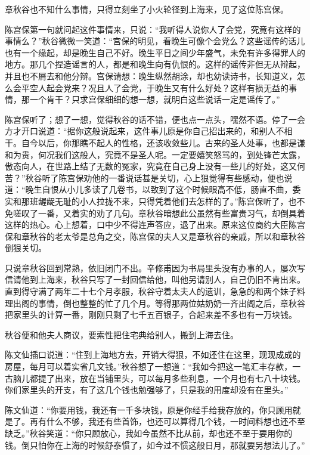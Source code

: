 \documentclass[12pt,UTF8]{ctexbook}
\begin{document}
{{{章秋谷也不知什么事情，只得立刻坐了小火轮径到上海来，见了这位陈宫保。

陈宫保第一句就问起这件事情来，只说：“我听得人说你人了会党，究竟有这样的事情么？”秋谷微微一笑道：“宫保的明见，看晚生可像个会党么？这些谣传的话儿也有一个缘起，却是晚生自己不好。晚生平日之间少年盛气，未免有许多得罪人的地方。那几个捏造谣言的人，都是和晚生向有仇恨的。这样的谣传非但无从辩起，并且也不屑去和他分辩。宫保请想：晚生纵然胡涂，却也幼读诗书，长知道义，怎么会平空人起会党来？况且人了会党，于晚生又有什么好处？这样有损无益的事情，那一个肯干？只求宫保细细的想一想，就明白这些说话一定是谣传了。”

陈宫保听了；想了一想，觉得秋谷的话不错，便也点一点头，嘿然不语。停了一会方才开口说道：“据你这般说起来，这件事儿原是你自己招出来的，和别人不相干。自今以后，你那瞧不起人的性格，还该收敛些儿。古来的圣人处事，也都是谦和为贵，何况我们这般人，究竟不是圣人呢。一定要嬉笑怒骂的，到处锋芒太露，傲态向人，在世路上结了无数的冤家，究竟在自己身上没有一些儿的好处，这又何苦？”秋谷听了陈宫保劝他的一番说话甚是关切，心上狠觉得有些感动，便也说道：“晚生自恨从小儿多读了几卷书，以致到了这个时候眼高不低，肠直不曲，委实和那班龌龊无耻的小人拉拢不来，只得凭着他们去怎样的了。”陈宫保听了，也不免嗟叹了一番，又着实的劝了几句。章秋谷暗想此公虽然有些富贵习气，却倒具着这样的热心。心上想着，口中少不得连声答应，退了出来。原来这位商约大臣陈宫保和章秋谷的老太爷是总角之交，陈宫保的夫人又是章秋谷的亲戚，所以和章秋谷倒狠关切。

只说章秋谷回到常熟，依旧闭门不出。辛修甫因为书局里头没有办事的人，屡次写信请他到上海来，秋谷只写了一封回信给他，叫他另请别人，自己仍旧不肯出来。直到得守满了两年二十七个月孝服，秋谷守着太夫人的遗训，急急的和两个妹子料理出阁的事情，倒也整整的忙了几个月。等得那两位姑奶奶一齐出阁之后，章秋谷把家里头的计算一番，刚刚只剩了七千五百银子，合起来差不多也有一万块钱。

秋谷便和他夫人商议，要索性把住宅典给别人，搬到上海去住。

陈文仙插口说道：“住到上海地方去，开销大得狠，不如还住在这里，现现成成的房屋，每月可以着实省几文钱。”秋谷想了一想道：“我如今把这一笔汇丰存款，一古脑儿都提了出来，放在当铺里头，可以每月多些利息，一个月也有七八十块钱。你们家里头的开支，有了这几个钱也勉强够了，只是我的用度却没有在里头。”

陈文仙道：“你要用钱，我还有一千多块钱，原是你经手给我存放的，你只顾用就是了。再有什么不够，我还有些首饰，也还可以算得几个钱，一时间料想也还不至缺乏。”秋谷笑道：“你只顾放心，我如今虽然不比从前，却也还不至于要用你的钱。倒只怕你在上海的时候舒泰惯了，如今过不惯这般日月，那就要另想法儿了。”

}}}
\end{document}
